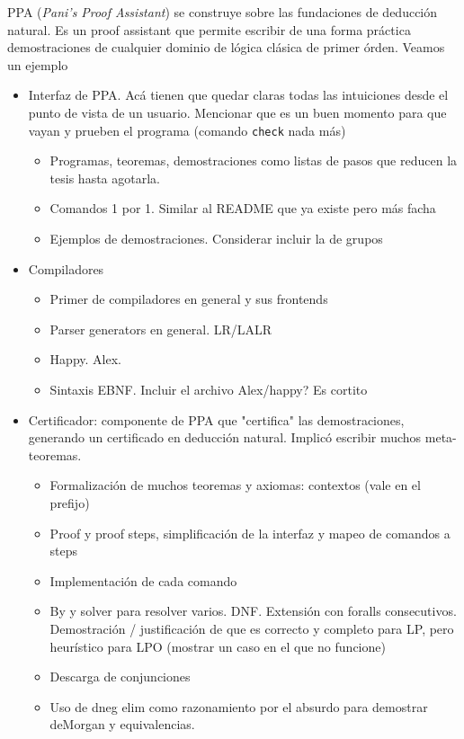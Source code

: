 PPA (\textit{Pani's Proof Assistant}) se construye sobre las fundaciones de
deducción natural. Es un proof assistant que permite escribir de una forma
práctica demostraciones de cualquier dominio de lógica clásica de primer órden.
Veamos un ejemplo


\begin{itemize}
    \item Interfaz de PPA. Acá tienen que quedar claras todas las intuiciones
    desde el punto de vista de un usuario. Mencionar que es un buen momento para
    que vayan y prueben el programa (comando \texttt{check} nada más)
    \begin{itemize}
        \item Programas, teoremas, demostraciones como listas de pasos que
        reducen la tesis hasta agotarla.
        \item Comandos 1 por 1. Similar al README que ya existe pero más facha
        \item Ejemplos de demostraciones. Considerar incluir la de grupos
    \end{itemize}
    \item Compiladores
    \begin{itemize}
        \item Primer de compiladores en general y sus frontends
        \item Parser generators en general. LR/LALR
        \item Happy. Alex.
        \item Sintaxis EBNF. Incluir el archivo Alex/happy? Es cortito
    \end{itemize}
    \item Certificador: componente de PPA que "certifica" las demostraciones,
    generando un certificado en deducción natural. Implicó escribir muchos
    meta-teoremas.
    \begin{itemize}
        \item Formalización de muchos teoremas y axiomas: contextos (vale en el prefijo)
        \item Proof y proof steps, simplificación de la interfaz y mapeo de
        comandos a steps
        \item Implementación de cada comando
        \item By y solver para resolver varios. DNF. Extensión con foralls
        consecutivos. Demostración / justificación de que es correcto y completo
        para LP, pero heurístico para LPO (mostrar un caso en el que no funcione)
        \item Descarga de conjunciones
        \item Uso de dneg elim como razonamiento por el absurdo para demostrar
        deMorgan y equivalencias.
    \end{itemize}
\end{itemize}